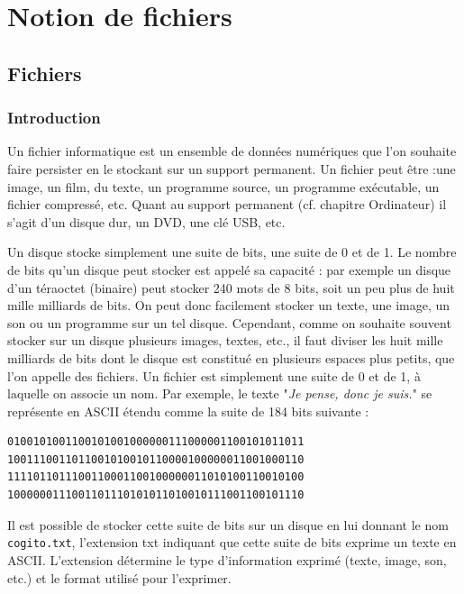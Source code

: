 \documentclass[11pt, a4paper]{book}
\begin{document}
\setcounter{chapter}{2}

\chapter{Notion de fichiers}

\section{Fichiers}
\subsection{Introduction}

Un fichier informatique est un ensemble de données numériques que l'on souhaite faire persister en le stockant sur un support permanent. Un fichier peut être :une image, un film, du texte, un programme source, un programme exécutable, un fichier compressé, etc. Quant au support permanent (cf. chapitre Ordinateur) il s'agit d'un disque dur, un DVD, une clé USB, etc.

Un disque stocke simplement une suite de bits, une suite de 0 et de 1. Le nombre de bits qu’un disque peut stocker est appelé sa capacité : par exemple un disque d’un téraoctet (binaire) peut stocker 240 mots de 8 bits, soit un peu plus de huit mille milliards de bits. On peut donc facilement stocker un texte, une image, un son ou un programme sur un tel disque. Cependant, comme on souhaite souvent stocker sur un disque plusieurs images, textes, etc., il faut diviser les huit mille milliards de bits dont le disque est constitué en plusieurs espaces plus petits, que l’on appelle des fichiers. Un fichier est simplement une suite de 0 et de 1, à laquelle on associe un nom. Par exemple, le texte "\textit{Je pense, donc je suis.}" se représente en ASCII étendu comme la suite de 184 bits suivante :

\begin{verbatim}
0100101001100101001000000111000001100101011011
1001110011011001010010110000100000011001000110
1111011011100110001100100000011010100110010100
1000000111001101110101011010010111001100101110
\end{verbatim}

Il est possible de stocker cette suite de bits sur un disque en lui donnant le nom \texttt{cogito.txt}, l’extension txt indiquant que cette suite de bits exprime un texte en ASCII. L’extension détermine le type d’information exprimé (texte, image, son, etc.) et le format utilisé pour l’exprimer.
\end{document}
